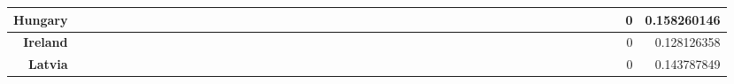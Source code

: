 \documentclass[a4paper,11pt]{report}
\begin{document}
\begin{appendices}
\begin{landscape}
\begin{longtable}{r|r|r|r|r|r|r|r|r|r|r|r|r|r|r|r|r|r|r|r|r|r|r|r|r|r|r|r|r|r|r|r|r|r|r|r|r|r|r|r|r|r|r|r|r|r|r|}
\multicolumn{1}{|r|}{\textbf{Hungary}}               &                  &                  &                  &                     &                  &                  &                                &                   &                  &                 &                         &                  &                  &                           &                  &                 &                  &                 &                  &                  &                  &                 &                 &                    &                &                  &                     &                 &                 &                   &                  &                 &                 &                   &                   &                &                 &                      &                          &                 &                  &                         &                 &                & 0                        & 0.158260146        \\ \hline
\multicolumn{1}{|r|}{\textbf{Ireland}}               &                  &                  &                  &                     &                  &                  &                                &                   &                  &                 &                         &                  &                  &                           &                  &                 &                  &                 &                  &                  &                  &                 &                 &                    &                &                  &                     &                 &                 &                   &                  &                 &                 &                   &                   &                &                 &                      &                          &                 &                  &                         &                 &                & 0                        & 0.128126358        \\ \hline
\multicolumn{1}{|r|}{\textbf{Latvia}}                &                  &                  &                  &                     &                  &                  &                                &                   &                  &                 &                         &                  &                  &                           &                  &                 &                  &                 &                  &                  &                  &                 &                 &                    &                &                  &                     &                 &                 &                   &                  &                 &                 &                   &                   &                &                 &                      &                          &                 &                  &                         &                 &                & 0                        & 0.143787849        \\ \hline

\end{longtable}
\end{landscape}
\end{appendices}
\end{document}
